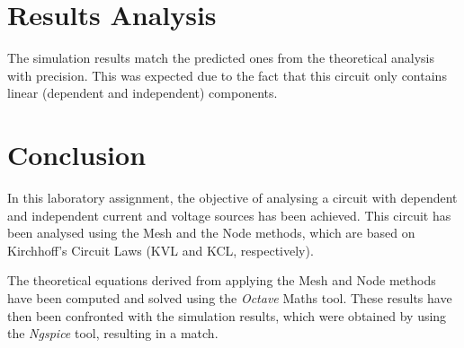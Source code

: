 \section{Results Analysis}
\label{sec:ResultsAnalysis}

\indent

The simulation results match the predicted ones from the theoretical analysis with precision. This was expected due to the fact that this circuit only contains linear (dependent and independent) components.


\section{Conclusion}
\label{sec:conclusion}

\indent

In this laboratory assignment, the objective of analysing a circuit with dependent and independent current and voltage sources has been achieved. This circuit has been analysed using the Mesh and the Node methods, which are based on Kirchhoff's Circuit Laws (KVL and KCL, respectively). 

The theoretical equations derived from applying the Mesh and Node methods have been computed and solved using the {\em Octave} Maths tool. These results have then been confronted with the simulation results, which were obtained by using the {\em Ngspice} tool, resulting in a match.

